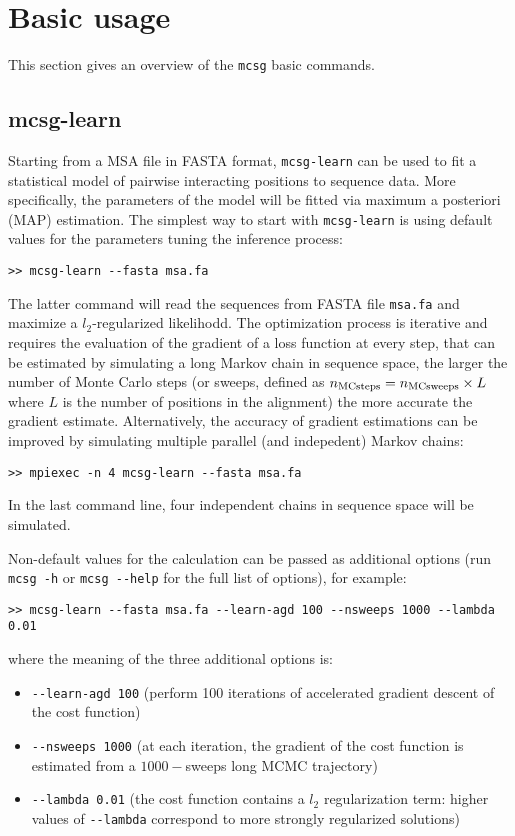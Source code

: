 \documentclass[a4paper,onecolumn]{article}
\begin{document}
\section{Basic usage}
\label{sec:basic}

This section gives an overview of the \verb|mcsg| basic commands.
\subsection{mcsg-learn}
\label{sec:mcsg-learn}
Starting from a MSA file in FASTA format, \verb|mcsg-learn| can be used to fit a statistical model of pairwise interacting positions to sequence data. 
More specifically, the parameters of the model will be fitted via maximum a posteriori (MAP) estimation.
The simplest way to start with \verb|mcsg-learn| is using default values for the parameters tuning the inference process:
\begin{verbatim}
>> mcsg-learn --fasta msa.fa
\end{verbatim}
The latter command will read the sequences from FASTA file \verb|msa.fa| and maximize a $l_2$-regularized likelihodd.
The optimization process is iterative and requires the evaluation of the gradient of a loss function at every step,
that can be estimated by simulating a long Markov chain in sequence space, the larger the number of Monte Carlo steps
(or sweeps, defined as $n_{\rm MC steps} = n_{\rm MC sweeps} \times L$ where $L$ is the number of positions in the alignment) the more accurate the gradient estimate. 
Alternatively, the accuracy of gradient estimations can be improved by simulating multiple parallel (and indepedent) Markov chains: 
\begin{verbatim}
>> mpiexec -n 4 mcsg-learn --fasta msa.fa
\end{verbatim}
In the last command line, four independent chains in sequence space will be simulated. 

Non-default values for the calculation can be passed as additional options (run \verb|mcsg -h| or \verb|mcsg --help| for the full list of options), for example: 
\begin{verbatim}
>> mcsg-learn --fasta msa.fa --learn-agd 100 --nsweeps 1000 --lambda 0.01
\end{verbatim}
where the meaning of the three additional options is: 
\begin{itemize}
\item \verb|--learn-agd 100| (perform 100 iterations of accelerated gradient descent of the cost function)
\item \verb|--nsweeps 1000| (at each iteration, the gradient of the cost function is estimated from a $1000-$sweeps long MCMC trajectory)
\item \verb|--lambda 0.01| (the cost function contains a $l_2$ regularization term: higher values of \verb|--lambda| correspond to more strongly regularized solutions)
\end{itemize}
\end{document}
